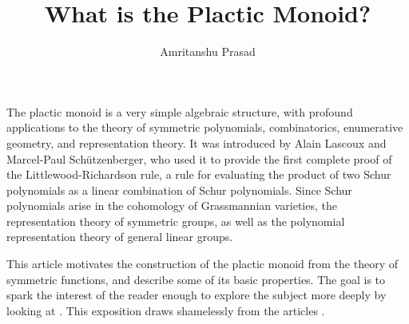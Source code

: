 \documentclass{amsart}
\title{What is the Plactic Monoid?}
\author{Amritanshu Prasad}
\theoremstyle{plain}
\begin{document}
\maketitle
The plactic monoid is a very simple algebraic structure, with profound applications to the theory of symmetric polynomials, combinatorics, enumerative geometry, and representation theory.
It was introduced by Alain Lascoux and Marcel-Paul Sch\"utzenberger, who used it to provide the first complete proof of the Littlewood-Richardson rule, a rule for evaluating the product of two Schur polynomials as a linear combination of Schur polynomials.
Since Schur polynomials arise in the cohomology of Grassmannian varieties, the representation theory of symmetric groups, as well as the polynomial representation theory of general linear groups.

This article motivates the construction of the plactic monoid from the theory of symmetric functions, and describe some of its basic properties.
The goal is to spark the interest of the reader enough to explore the subject more deeply by looking at \cite{fultonyt,Lascoux}.
This exposition draws shamelessly from the articles \cite{plaxique,Lascoux}.
\end{document}
